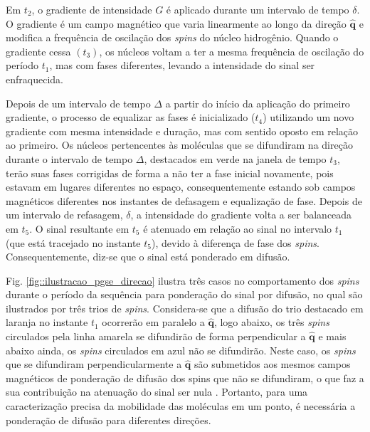 \documentclass[
    12pt,                %
    oneside,            %
    a4paper,            %
    english,            %
    french,                %
    spanish,            %
    brazil                %
    ]{abntex2}
\begin{document}

Em $t_2$, o gradiente de intensidade $G$ é aplicado durante um intervalo de tempo $\delta$. O gradiente é um campo magnético que varia linearmente ao longo da direção $\mathbf{\hat{q}}$ e modifica a frequência de oscilação dos \textit{spins} do núcleo hidrogênio. Quando o gradiente cessa $(t_3)$, os núcleos voltam a ter a mesma frequência de oscilação do período $t_1$, mas com fases diferentes, levando a intensidade do sinal ser enfraquecida.

Depois de um intervalo de tempo $\Delta$ a partir do início da aplicação do primeiro gradiente, o processo de equalizar as fases é inicializado ($t_4$) utilizando um novo gradiente com mesma intensidade e duração, mas com sentido oposto em relação ao primeiro. Os núcleos pertencentes às moléculas que se difundiram na direção durante o intervalo de tempo $\Delta$, destacados em verde na janela de tempo $t_3$, terão suas fases corrigidas de forma a não ter a fase inicial novamente, pois estavam em lugares diferentes no espaço, consequentemente estando sob campos magnéticos diferentes nos instantes de defasagem e equalização de fase. Depois de um intervalo de refasagem, $\delta$, a intensidade do gradiente volta a ser balanceada em $t_5$.
O sinal resultante em $t_5$ é atenuado em relação ao sinal no intervalo $t_1$ (que está tracejado no instante $t_5$), devido à diferença de fase dos \textit{spins}. Consequentemente, diz-se que o sinal está ponderado em difusão.

Fig. \ref{fig::ilustracao_pgse_direcao} ilustra três casos no comportamento dos \textit{spins} durante o período da sequência para ponderação do sinal por difusão, no qual são ilustrados por três trios de \textit{spins}. Considera-se que a difusão do trio destacado em laranja no instante $t_1$ ocorrerão em paralelo a $\mathbf{\hat{q}}$, logo abaixo, os três \textit{spins} circulados pela linha amarela se difundirão de forma perpendicular a $\mathbf{\hat{q}}$ e mais abaixo ainda, os \textit{spins} circulados em azul não se difundirão. Neste caso, os \textit{spins} que se difundiram perpendicularmente a $\mathbf{\hat{q}}$ são submetidos aos mesmos campos magnéticos de ponderação de difusão dos spins que não se difundiram, o que faz a sua contribuição na atenuação do sinal ser nula \cite{mori2013}. Portanto, para uma caracterização precisa da mobilidade das moléculas em um ponto, é necessária a ponderação de difusão para diferentes direções.
\end{document}
